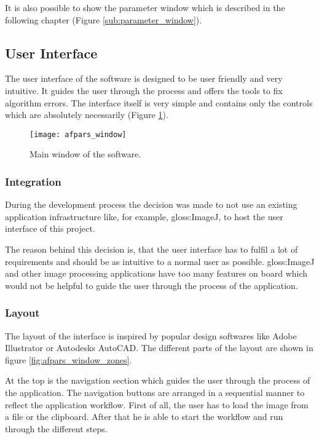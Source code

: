 It is also possible to show the parameter window which is described in the following chapter (Figure \ref{sub:parameter_window}).

\subsection{User Interface}
\label{sub:userInterface}

The user interface of the software is designed to be user friendly and very intuitive. It guides the user through the process and offers the tools to fix algorithm errors. The interface itself is very simple and contains only the controls which are absolutely necessarily (Figure \ref{fig:afpars_window}).

\begin{figure}[H]
  \centering
      \texttt{[image: afpars\_window]}
  \caption{Main window of the software.}
  \label{fig:afpars_window}
\end{figure}

\subsubsection{Integration}
During the development process the decision was made to not use an existing application infrastructure like, for example, \gls{gloss:ImageJ}, to host the user interface of this project.

The reason behind this decision is, that the user interface has to fulfil a lot of requirements and should be as intuitive to a normal user as possible. \gls{gloss:ImageJ} and other image processing applications have too many features on board which would not be helpful to guide the user through the process of the application.

\subsubsection{Layout}

The layout of the interface is inspired by popular design softwares like Adobe Illustrator or Autodesks AutoCAD. The different parts of the layout are shown in figure \ref{fig:afpars_window_zones}.

At the top is the navigation section which guides the user through the process of the application. The navigation buttons are arranged in a sequential manner to reflect the application workflow. First of all, the user has to load the image from a file or the clipboard. After that he is able to start the workflow and run through the different steps.

